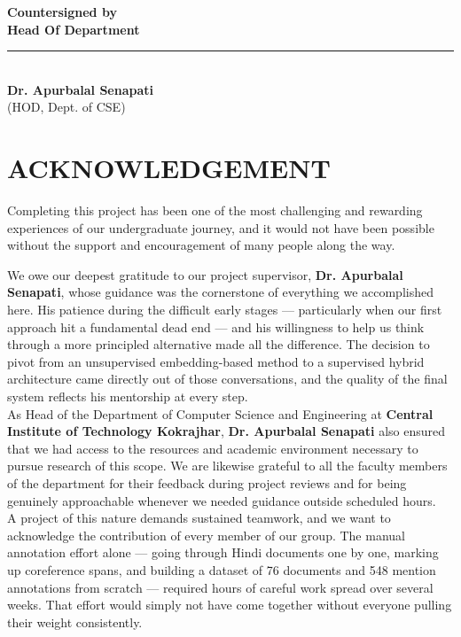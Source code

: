 \documentclass[12pt,a4paper]{report}
\begin{document}
\noindent \textbf{Countersigned by}\\[0.1cm]

\noindent \textbf{Head Of Department}\\[0.5cm]
\rule{4cm}{0.4pt}\\[0.1cm]
\textbf{Dr. Apurbalal Senapati}\\
(HOD, Dept. of CSE)


\newpage
\chapter*{\fontsize{20}{24}\selectfont ACKNOWLEDGEMENT}

\noindent Completing this project has been one of the most challenging and rewarding experiences of our undergraduate journey, and it would not have been possible without the support and encouragement of many people along the way.

\noindent We owe our deepest gratitude to our project supervisor, \textbf{Dr. Apurbalal Senapati}, whose guidance was the cornerstone of everything we accomplished here. His patience during the difficult early stages --- particularly when our first approach hit a fundamental dead end --- and his willingness to help us think through a more principled alternative made all the difference. The decision to pivot from an unsupervised embedding-based method to a supervised hybrid architecture came directly out of those conversations, and the quality of the final system reflects his mentorship at every step.\\[0.5cm]

\noindent As Head of the Department of Computer Science and Engineering at \textbf{Central Institute of Technology Kokrajhar}, \textbf{Dr. Apurbalal Senapati} also ensured that we had access to the resources and academic environment necessary to pursue research of this scope. We are likewise grateful to all the faculty members of the department for their feedback during project reviews and for being genuinely approachable whenever we needed guidance outside scheduled hours.\\[0.5cm]

\noindent A project of this nature demands sustained teamwork, and we want to acknowledge the contribution of every member of our group. The manual annotation effort alone --- going through Hindi documents one by one, marking up coreference spans, and building a dataset of 76 documents and 548 mention annotations from scratch --- required hours of careful work spread over several weeks. That effort would simply not have come together without everyone pulling their weight consistently.\\[0.5cm]
\end{document}
